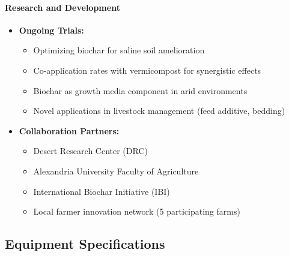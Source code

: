 \paragraph{Research and Development}
\begin{itemize}
    \item \textbf{Ongoing Trials:}
    \begin{itemize}
        \item Optimizing biochar for saline soil amelioration
        \item Co-application rates with vermicompost for synergistic effects
        \item Biochar as growth media component in arid environments
        \item Novel applications in livestock management (feed additive, bedding)
    \end{itemize}
    
    \item \textbf{Collaboration Partners:}
    \begin{itemize}
        \item Desert Research Center (DRC)
        \item Alexandria University Faculty of Agriculture
        \item International Biochar Initiative (IBI)
        \item Local farmer innovation network (5 participating farms)
    \end{itemize}
\end{itemize}

\subsection{Equipment Specifications}

